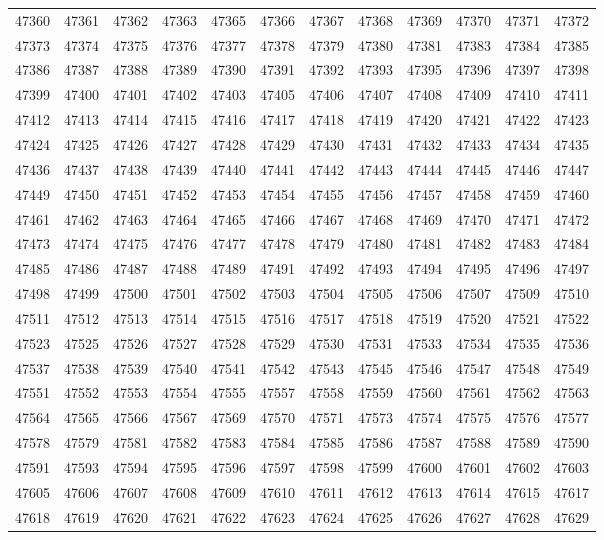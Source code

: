 \begin{center}
\begin{longtable}{llllllllllll}
47360 &47361 &47362 &47363 &47365 &47366 &47367 &47368 &47369 &47370 &47371 &47372 \\
47373 &47374 &47375 &47376 &47377 &47378 &47379 &47380 &47381 &47383 &47384 &47385 \\
47386 &47387 &47388 &47389 &47390 &47391 &47392 &47393 &47395 &47396 &47397 &47398 \\
47399 &47400 &47401 &47402 &47403 &47405 &47406 &47407 &47408 &47409 &47410 &47411 \\
47412 &47413 &47414 &47415 &47416 &47417 &47418 &47419 &47420 &47421 &47422 &47423 \\
47424 &47425 &47426 &47427 &47428 &47429 &47430 &47431 &47432 &47433 &47434 &47435 \\
47436 &47437 &47438 &47439 &47440 &47441 &47442 &47443 &47444 &47445 &47446 &47447 \\
47449 &47450 &47451 &47452 &47453 &47454 &47455 &47456 &47457 &47458 &47459 &47460 \\
47461 &47462 &47463 &47464 &47465 &47466 &47467 &47468 &47469 &47470 &47471 &47472 \\
47473 &47474 &47475 &47476 &47477 &47478 &47479 &47480 &47481 &47482 &47483 &47484 \\
47485 &47486 &47487 &47488 &47489 &47491 &47492 &47493 &47494 &47495 &47496 &47497 \\
47498 &47499 &47500 &47501 &47502 &47503 &47504 &47505 &47506 &47507 &47509 &47510 \\
47511 &47512 &47513 &47514 &47515 &47516 &47517 &47518 &47519 &47520 &47521 &47522 \\
47523 &47525 &47526 &47527 &47528 &47529 &47530 &47531 &47533 &47534 &47535 &47536 \\
47537 &47538 &47539 &47540 &47541 &47542 &47543 &47545 &47546 &47547 &47548 &47549 \\
47551 &47552 &47553 &47554 &47555 &47557 &47558 &47559 &47560 &47561 &47562 &47563 \\
47564 &47565 &47566 &47567 &47569 &47570 &47571 &47573 &47574 &47575 &47576 &47577 \\
47578 &47579 &47581 &47582 &47583 &47584 &47585 &47586 &47587 &47588 &47589 &47590 \\
47591 &47593 &47594 &47595 &47596 &47597 &47598 &47599 &47600 &47601 &47602 &47603 \\
47605 &47606 &47607 &47608 &47609 &47610 &47611 &47612 &47613 &47614 &47615 &47617 \\
47618 &47619 &47620 &47621 &47622 &47623 &47624 &47625 &47626 &47627 &47628 &47629 \\

\end{longtable}
\end{center}
